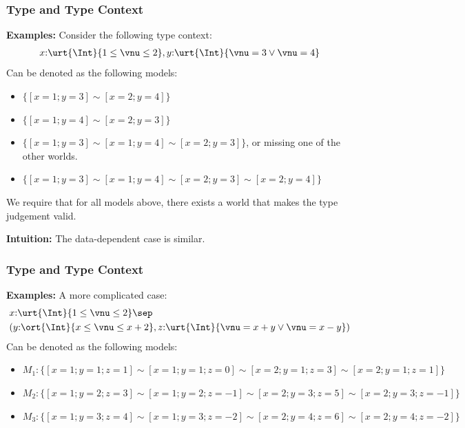\begin{frame}[fragile]
    \frametitle{Type and Type Context}

\textbf{Examples:} Consider the following type context:
\begin{align*}
    x{:}\urt{\Int}{1 \leq \vnu \leq 2}, y{:}\urt{\Int}{\vnu = 3 \lor \vnu = 4}
\end{align*}\noindent
Can be denoted as the following models:
\begin{itemize}
    \item $\{[x=1;y=3] \sim [x=2;y=4]\}$
    \item $\{[x=1;y=4] \sim [x=2;y=3]\}$
    \item $\{[x=1;y=3] \sim [x=1;y=4] \sim [x=2;y=3]\}$, or missing one of the other worlds.
    \item $\{[x=1;y=3] \sim [x=1;y=4] \sim [x=2;y=3] \sim [x=2;y=4]\}$
\end{itemize}
We require that for all models above, there exists a world that makes the type judgement valid.

\textbf{Intuition:} The data-dependent case is similar.
\end{frame}

\begin{frame}[fragile]
    \frametitle{Type and Type Context}

\textbf{Examples:} A more complicated case:
\begin{align*}
    &x{:}\urt{\Int}{1 \leq \vnu \leq 2} \sep 
    \\&(y{:}\ort{\Int}{x \leq \vnu \leq x + 2}, z{:}\urt{\Int}{\vnu = x + y \lor \vnu = x - y})
\end{align*}\noindent
Can be denoted as the following models:
{\small
\begin{itemize}
    \item $M_1: \{[x=1;y=1;z=1] \sim [x=1;y=1;z=0] \sim  [x=2;y=1;z=3]  \sim [x=2;y=1;z=1] \}$
    \item $M_2: \{[x=1;y=2;z=3] \sim [x=1;y=2;z=-1] \sim  [x=2;y=3;z=5]  \sim [x=2;y=3;z=-1] \}$
    \item $M_3: \{[x=1;y=3;z=4] \sim [x=1;y=3;z=-2] \sim  [x=2;y=4;z=6]  \sim [x=2;y=4;z=-2] \}$
\end{itemize}}

\end{frame}

